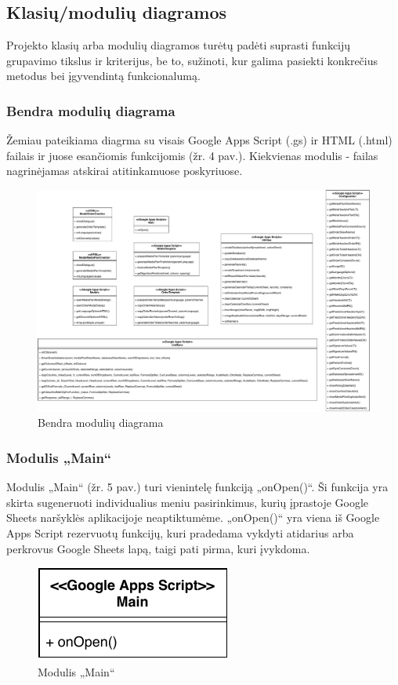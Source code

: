 \subsection{Klasių/modulių diagramos}
Projekto klasių arba modulių diagramos turėtų padėti suprasti funkcijų grupavimo tikslus ir kriterijus, be to, sužinoti, kur galima pasiekti konkrečius metodus bei įgyvendintą funkcionalumą.

\subsubsection{Bendra modulių diagrama}
Žemiau pateikiama diagrma su visais Google Apps Script (.gs) ir HTML (.html) failais ir juose esančiomis funkcijomis (žr. 4 pav.). Kiekvienas modulis - failas nagrinėjamas atskirai atitinkamuose poskyriuose.

\begin{figure}[H]
    \centering
    \includegraphics[scale=0.35]{Images/modules.pdf}
    \caption{Bendra modulių diagrama}
    \label{img:model}
\end{figure}

\subsubsection{Modulis „Main“}
Modulis „Main“ (žr. 5 pav.) turi vienintelę funkciją „onOpen()“. Ši funkcija yra skirta sugeneruoti individualius meniu pasirinkimus, kurių įprastoje Google Sheets naršyklės aplikacijoje neaptiktumėme. „onOpen()“ yra viena iš Google Apps Script rezervuotų funkcijų, kuri pradedama vykdyti atidarius arba perkrovus Google Sheets lapą, taigi pati pirma, kuri įvykdoma.

\begin{figure}[H]
    \centering
    \includegraphics[scale=1]{Images/module-main.pdf}
    \caption{Modulis „Main“}
    \label{img:model}
\end{figure}

